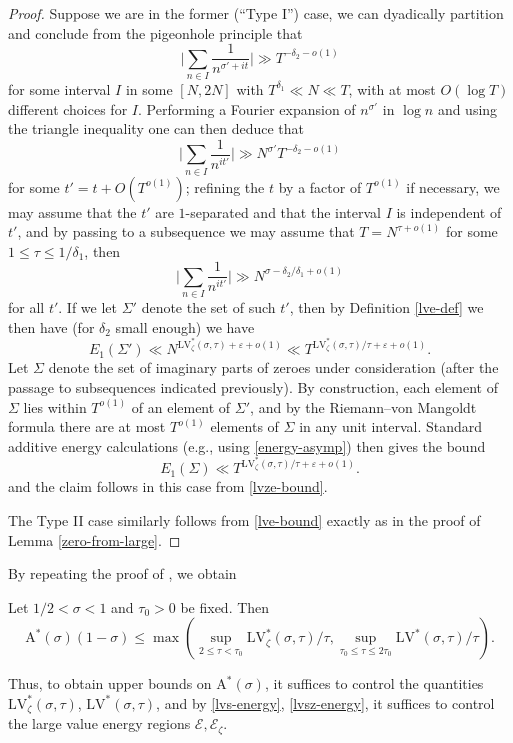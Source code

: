 \documentclass[a4paper, 10pt]{amsart}
\newcommand{\eps}{\varepsilon}
\newcommand{\LV}{\mathrm{LV}}
\newcommand{\A}{\mathrm{A}}
\newcommand{\Energy}{\mathcal{E}}
\begin{document}
\begin{proof}
    Suppose we are in the former (``Type I'') case, we can dyadically partition and conclude from the pigeonhole principle that
    $$ \bigg| \sum_{n \in I} \frac{1}{n^{\sigma'+it}} \bigg| \gg T^{-\delta_2-o(1)}$$
    for some interval $I$ in some $[N,2N]$ with $T^{\delta_1} \ll N \ll T$, with at most $O(\log T)$ different choices for $I$.  Performing a Fourier expansion of $n^{\sigma'}$ in $\log n$ and using the triangle inequality one can then deduce that
    $$ \bigg| \sum_{n \in I} \frac{1}{n^{it'}} \bigg| \gg N^{\sigma'} T^{-\delta_2-o(1)}$$
    for some $t' = t + O(T^{o(1)})$; refining the $t$ by a factor of $T^{o(1)}$ if necessary, we may assume that the $t'$ are $1$-separated and that the interval $I$ is independent of $t'$, and by passing to a subsequence we may assume that $T = N^{\tau+o(1)}$ for some $1 \leq \tau \leq 1/\delta_1$, then
    $$ \bigg| \sum_{n \in I} \frac{1}{n^{it'}} \bigg| \gg N^{\sigma-\delta_2/\delta_1+o(1)}$$
    for all $t'$.  If we let $\Sigma'$ denote the set of such $t'$, then by Definition \ref{lve-def} we then have (for $\delta_2$ small enough) we have
    $$ E_1(\Sigma') \ll N^{\LV^*_\zeta(\sigma,\tau) + \eps + o(1)} \ll T^{\LV^*_\zeta(\sigma,\tau)/\tau + \eps + o(1)}.$$
    Let $\Sigma$ denote the set of imaginary parts of zeroes under consideration (after the passage to subsequences indicated previously).  By construction, each element of $\Sigma$ lies within $T^{o(1)}$ of an element of $\Sigma'$, and by the Riemann--von Mangoldt formula there are at most $T^{o(1)}$ elements of $\Sigma$ in any unit interval.  Standard additive energy calculations (e.g., using \eqref{energy-asymp}) then gives the bound
    $$ E_1(\Sigma) \ll T^{\LV^*_\zeta(\sigma,\tau)/\tau + \eps + o(1)}.$$
    and the claim follows in this case from \eqref{lvze-bound}.

    The Type II case similarly follows from \eqref{lve-bound} exactly as in the proof of Lemma \ref{zero-from-large}.
\end{proof}

By repeating the proof of , we obtain

\begin{corollary}\label{zeroe-large-cor-0} Let $1/2 < \sigma < 1$ and $\tau_0 > 0$ be fixed.  Then
    $$ \A^*(\sigma)(1-\sigma) \leq \max \left(\sup_{2 \leq \tau < \tau_0} \LV^*_\zeta(\sigma,\tau)/\tau, \sup_{\tau_0 \leq \tau \leq 2\tau_0} \LV^*(\sigma,\tau)/\tau\right).$$
    \end{corollary}

Thus, to obtain upper bounds on $\A^*(\sigma)$, it suffices to control the quantities $\LV^*_\zeta(\sigma,\tau)$, $\LV^*(\sigma,\tau)$, and by \eqref{lvs-energy}, \eqref{lvsz-energy}, it suffices to control the large value energy regions $\Energy, \Energy_\zeta$.
\end{document}
